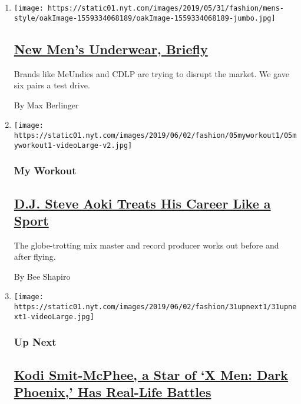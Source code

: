 \begin{enumerate}
\def\labelenumi{\arabic{enumi}.}
\item
  \texttt{[image: https://static01.nyt.com/images/2019/05/31/fashion/mens-style/oakImage-1559334068189/oakImage-1559334068189-jumbo.jpg]}

  \hypertarget{new-mens-underwear-briefly}{%
  \subsection{\texorpdfstring{\href{/2019/06/05/fashion/mens-style/new-mens-underwear-briefly.html}{New
  Men's Underwear,
  Briefly}}{New Men's Underwear, Briefly}}\label{new-mens-underwear-briefly}}

  Brands like MeUndies and CDLP are trying to disrupt the market. We
  gave six pairs a test drive.

  By Max Berlinger
\item
  \texttt{[image: https://static01.nyt.com/images/2019/06/02/fashion/05myworkout1/05myworkout1-videoLarge-v2.jpg]}

  \hypertarget{my-workout}{%
  \subsubsection{My Workout}\label{my-workout}}

  \hypertarget{dj-steve-aoki-treats-his-career-like-a-sport}{%
  \subsection{\texorpdfstring{\href{/2019/06/05/style/steve-aoki-dj.html}{D.J.
  Steve Aoki Treats His Career Like a
  Sport}}{D.J. Steve Aoki Treats His Career Like a Sport}}\label{dj-steve-aoki-treats-his-career-like-a-sport}}

  The globe-trotting mix master and record producer works out before and
  after flying.

  By Bee Shapiro
\item
  \texttt{[image: https://static01.nyt.com/images/2019/06/02/fashion/31upnext1/31upnext1-videoLarge.jpg]}

  \hypertarget{up-next}{%
  \subsubsection{Up Next}\label{up-next}}

  \hypertarget{kodi-smit-mcphee-a-star-of-x-men-dark-phoenix-has-real-life-battles}{%
  \subsection{\texorpdfstring{\href{/2019/05/31/style/kodi-smit-mcphee-x-men-dark-phoenix.html}{Kodi
  Smit-McPhee, a Star of `X Men: Dark Phoenix,' Has Real-Life
  Battles}}{Kodi Smit-McPhee, a Star of `X Men: Dark Phoenix,' Has Real-Life Battles}}\label{kodi-smit-mcphee-a-star-of-x-men-dark-phoenix-has-real-life-battles}}


\end{enumerate}
